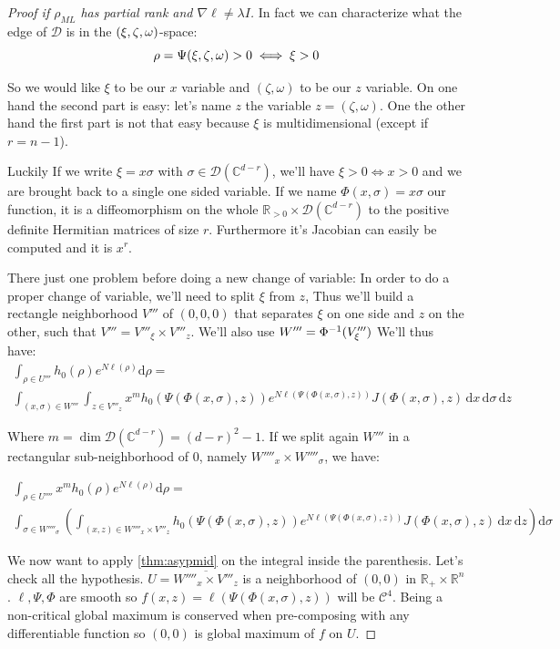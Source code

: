 \documentclass[10pt,a4paper]{report}
\theoremstyle{plain}
\theoremstyle{definition}
\theoremstyle{remark}
\newcommand{\R}{\ensuremath{\mathbb{R}}}
\newcommand{\C}{\ensuremath{\mathbb{C}}}
\newcommand{\dd}{\mathrm{d}}
\newcommand{\class}[1]{{\mathscr{C}^{#1}}}
\newcommand{\ml}{_{M\!L}}
\begin{document}
\begin{proof}[Proof if $\rho\ml$ has partial rank and $\nabla \ell \neq \lambda I$]
  In fact we can characterize what the edge of $\mathcal{D}$ is in the
  $(\xi,\zeta,\omega)$-space:
  \[\rho = \Psi(\xi,\zeta,\omega) > 0 \iff \xi >0\]

  So we would like $\xi$ to be our $x$ variable and $(\zeta,\omega)$ to be our
  $z$ variable. On one hand the second part is easy: let's name $z$ the variable
  $z = (\zeta,\omega)$. One the other hand the first part is not that easy
  because $\xi$ is multidimensional (except if $r = n-1$).

  Luckily If we write $\xi = x \sigma$ with $\sigma \in \mathcal{D}(\C^{d-r})$,
  we'll have $\xi > 0 \iff x > 0$ and we are brought back to a single one sided
  variable. If we name $\Phi(x,\sigma) = x \sigma$ our function, it is a
  diffeomorphism on the whole $\R_{>0} \times \mathcal{D}(\C^{d-r})$ to the positive
  definite Hermitian matrices of size $r$. Furthermore it's Jacobian can easily
  be computed and it is $x^r$.

  There just one problem before doing a new change
  of variable: In order to do a proper change of variable, we'll
  need to split $\xi$ from $z$, Thus we'll build a rectangle
  neighborhood $V'''$ of
  $(0,0,0)$ that separates $\xi$ on one side and $z$ on the other,
  such that $V''' = V'''_\xi \times V'''_z$.
  We'll also use $W''' = \Phi^{-1}(V'''_\xi)$ We'll thus have:
  \newcommand{\ppvars}{\Psi(\Phi(x,\sigma),z)}
  \newcommand{\pvvars}{(\Phi(x,\sigma),z)}
  \newcommand{\pdvars}{\dd x\, \dd \sigma\, \dd z}
  \begin{multline}
    \int_{\rho \in U'''} h_0(\rho)e^{N\ell(\rho)}\dd \rho =\\
    \int_{(x,\sigma) \in W'''}\int_{z \in V'''_z} x^m h_0(\ppvars)e^{N\ell(\ppvars)}J\pvvars
    \,\pdvars
  \end{multline}

  Where $m = \dim \mathcal{D}(\C^{d-r}) = (d-r)^2 -1$.
  If we split again $W'''$ in a rectangular sub-neighborhood of $0$, namely $W''''_x \times
  W''''_\sigma$, we have:

  \begin{multline}
    \int_{\rho \in U''''} x^m h_0(\rho)e^{N\ell(\rho)}\dd \rho =\\
    \int_{\sigma \in W''''_\sigma}\left(  \int_{(x,z) \in W''''_x \times V'''_z}
      h_0(\ppvars)e^{N\ell(\ppvars)}J\pvvars \,\dd x \, \dd z
    \right) \dd \sigma
  \end{multline}

  We now want to apply \cref{thm:asypmid} on the integral inside the
  parenthesis. Let's check all the hypothesis. $U = \overline{W''''_x \times
    V'''_z}$ is a neighborhood of $(0,0)$ in $\R_+ \times \R^n$.
  $\ell, \Psi, \Phi$ are smooth so
  $f(x,z) = \ell(\ppvars)$ will be $\class 4$. Being a non-critical global maximum
  is conserved when pre-composing with any differentiable function so $(0,0)$ is global maximum
  of $f$ on $U$.


\end{proof}
\end{document}
